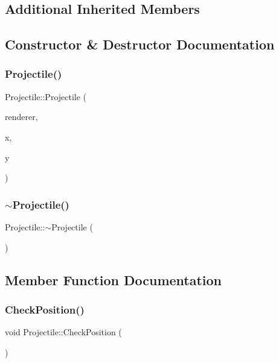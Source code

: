 \subsection*{Additional Inherited Members}


\subsection{Constructor \& Destructor Documentation}
\mbox{\label{class_projectile_a0906140caebe54c0b087c7e6240f3084}} 
\subsubsection{\texorpdfstring{Projectile()}{Projectile()}}
{\footnotesize\ttfamily Projectile\+::\+Projectile (\begin{DoxyParamCaption}\item[{S\+D\+L\+\_\+\+Renderer $\ast$}]{renderer,  }\item[{int}]{x,  }\item[{int}]{y }\end{DoxyParamCaption})}

\mbox{\label{class_projectile_a94903e021fa2edab60ba3836ca0b937d}} 
\subsubsection{\texorpdfstring{$\sim$\+Projectile()}{~Projectile()}}
{\footnotesize\ttfamily Projectile\+::$\sim$\+Projectile (\begin{DoxyParamCaption}{ }\end{DoxyParamCaption})}



\subsection{Member Function Documentation}
\mbox{\label{class_projectile_a6baf0fc9681b7c13b64a1c82671e296f}} 
\subsubsection{\texorpdfstring{Check\+Position()}{CheckPosition()}}
{\footnotesize\ttfamily void Projectile\+::\+Check\+Position (\begin{DoxyParamCaption}{ }\end{DoxyParamCaption})\hspace{0.3cm}{\ttfamily [protected]}}



